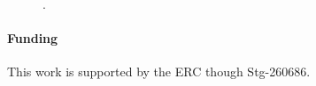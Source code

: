 \documentclass{bioinfo}
\begin{document}
\begin{figure}[bhtp]
	\begin{center}
\caption[labelInTOC]{.}
\label{fig:gspace}
\end{center}
\end{figure}



\paragraph{Funding\textcolon}This work is supported by the ERC though
Stg-260686.



\end{document}
